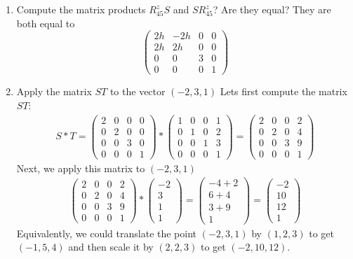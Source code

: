 \documentclass{book}
\begin{document}
\begin{enumerate}
\item Compute the matrix products $R^z_{45} S$ and $S R^z_{45}$? Are they equal?
They are both equal to
\[
\left (
\begin{array}{cccc}
2h & -2h &0 & 0 \\
2h & 2h & 0 & 0 \\
0 & 0 & 3 & 0 \\
0 & 0 & 0 & 1
\end{array}
\right )
\]

\item Apply the matrix $S T$ to the vector $(-2,3,1)$
\newline
Lets first compute the matrix $ST$:
\begin{eqnarray*}
S * T =
\left (
\begin{array}{cccc}
2 & 0 & 0 & 0 \\
0 & 2 & 0 & 0 \\
0 & 0 & 3 & 0 \\
0 & 0 & 0 & 1
\end{array}
\right )
*
\left (
\begin{array}{cccc}
1 & 0 & 0 & 1 \\
0 & 1 & 0 & 2 \\
0 & 0 & 1 & 3 \\
0 & 0 & 0 & 1
\end{array}
\right )
=
\left (
\begin{array}{cccc}
2 & 0 & 0 & 2 \\
0 & 2 & 0 & 4 \\
0 & 0 & 3 & 9 \\
0 & 0 & 0 & 1
\end{array}
\right )
\end{eqnarray*}
Next, we apply this matrix to $(-2,3,1)$
\begin{eqnarray*}
\left (
\begin{array}{cccc}
2 & 0 & 0 & 2 \\
0 & 2 & 0 & 4 \\
0 & 0 & 3 & 9 \\
0 & 0 & 0 & 1
\end{array}
\right )
*
\left (
\begin{array}{cccc}
-2\\ 3\\ 1 \\1
\end{array}
\right )
=
\left (
\begin{array}{cccc}
-4 +2 \\  6+4 \\ 3+9 \\ 1
\end{array}
\right )
=
\left (
\begin{array}{cccc}
-2 \\  10 \\ 12 \\ 1
\end{array}
\right )
\end{eqnarray*}
Equivalently, we could translate the point
$(-2,3,1)$ by $(1,2,3)$ to get $(-1,5,4)$ and
then scale it by $(2,2,3)$ to get $(-2,10,12)$.
\end{enumerate}
\end{document}
